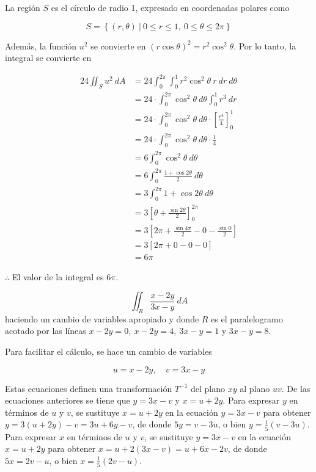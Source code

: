 \documentclass[12pt]{exam}
\begin{document}
\begin{questions}
  La región $S$ es el círculo de radio 1, expresado en coordenadas polares como 
  
  \[
  S = \left\{(r, \theta)~|~0 \leq r \leq 1,~0 \leq \theta \leq 2\pi\right\}
  \]

  Además, la función $u^2$ se convierte en $(r\cos{\theta})^2 = r^2\cos^2{\theta}$. Por lo tanto, la integral se convierte en

  \begin{align*}
    24 \iint_S u^2~dA
    &= 24 \int_{0}^{2\pi}\int_{0}^{1} r^2\cos^2{\theta}~r~dr~d\theta\\
    &= 24 \cdot \int_{0}^{2\pi}\cos^2{\theta}~d\theta \int_{0}^{1} r^3~dr\\
    &= 24 \cdot \int_{0}^{2\pi}\cos^2{\theta}~d\theta \cdot \left[\frac{r^4}{4}\right]_{0}^{1}\\
    &= 24 \cdot \int_{0}^{2\pi}\cos^2{\theta}~d\theta \cdot \frac{1}{4}\\
    &= 6 \int_{0}^{2\pi}\cos^2{\theta}~d\theta\\
    &= 6 \int_{0}^{2\pi}\frac{1 + \cos{2\theta}}{2}~d\theta\\
    &= 3 \int_{0}^{2\pi}1 + \cos{2\theta}~d\theta\\
    &= 3 \left[\theta + \frac{\sin{2\theta}}{2}\right]_{0}^{2\pi}\\
    &= 3 \left[2\pi + \frac{\sin{4\pi}}{2} - 0 - \frac{\sin{0}}{2}\right]\\
    &= 3 \left[2\pi + 0 - 0 - 0\right]\\
    &= 6\pi
  \end{align*}

  $\therefore$ El valor de la integral es 6$\pi$.

  \[
  \iint_R \frac{x-2y}{3x-y}~dA
  \]
  haciendo un cambio de variables apropiado y donde $R$ es el paralelogramo acotado por las líneas $x - 2y = 0,~ x - 2y = 4, ~3x - y = 1$ y $3x - y = 8$.

  Para facilitar el cálculo, se hace un cambio de variables 

  \[
  u = x - 2y, \quad v = 3x - y
  \]

  Estas ecuaciones definen una transformación $T^{-1}$ del plano $xy$ al plano $uv$. De las ecuaciones anteriores se tiene que $y=3x-v$ y $x=u+2y$.
  Para expresar $y$ en términos de $u$ y $v$, se sustituye $x=u+2y$ en la ecuación $y=3x-v$ para obtener $y=3(u+2y)-v= 3u + 6y -v$, de donde $5y = v - 3u$, o bien 
  $y = \frac{1}{5} (v-3u)$.
  Para expresar $x$ en términos de $u$ y $v$, se sustituye $y=3x-v$ en la ecuación $x=u+2y$ para obtener $x=u+2(3x-v) = u + 6x - 2v$, de donde $5x = 2v - u$, o bien
  $x = \frac{1}{5} (2v - u)$.


\end{questions}
\end{document}
